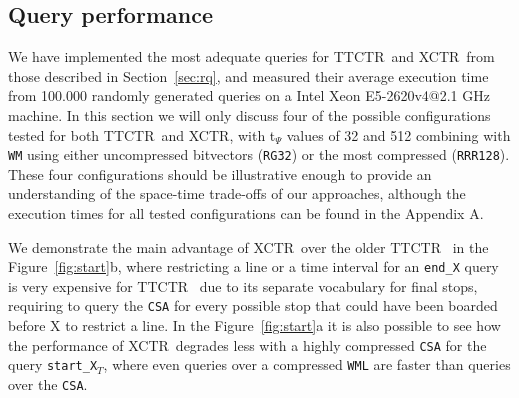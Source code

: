 \documentclass[runningheads]{llncs}
\newcommand{\ctr}{XCTR}
\newcommand{\ttctr}{TTCTR}
\begin{document}
\subsection{Query performance}
\label{sec:time}
We have implemented the most adequate queries for \ttctr~and \ctr~from those described in Section~\ref{sec:rq}, and measured their average execution time from 100.000 randomly generated queries on a Intel Xeon E5-2620v4@2.1 GHz machine. In this section we will only discuss four of the possible configurations tested for both \ttctr~and \ctr, with t$_{\Psi}$ values of 32 and 512 combining with \texttt{WM} using either uncompressed bitvectors (\texttt{RG32}) or the most compressed (\texttt{RRR128}). These four configurations should be illustrative enough to provide an understanding of the space-time trade-offs of our approaches, although the execution times for all tested configurations can be found in the Appendix A.

We demonstrate the main advantage of \ctr~over the older \ttctr~ in the Figure~\ref{fig:start}b, where restricting a line or a time interval for an \texttt{end\_X} query is very expensive for \ttctr~ due to its separate vocabulary for final stops, requiring to query the \texttt{CSA} for every possible stop that could have been boarded before X to restrict a line. In the Figure~\ref{fig:start}a it is also possible to see how the performance of \ctr~degrades less with a highly compressed \texttt{CSA} for the query \texttt{start\_X$_T$}, where even queries over a compressed \texttt{WML} are faster than queries over the \texttt{CSA}.

\end{document}
